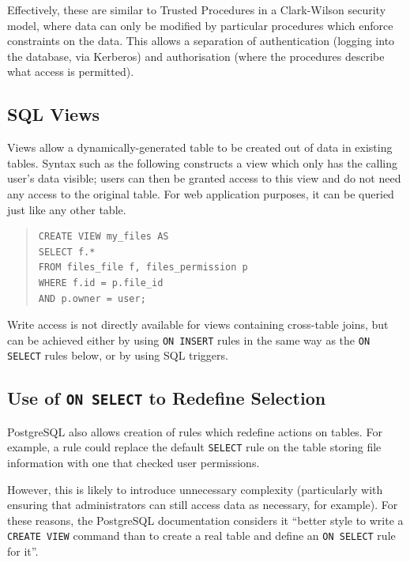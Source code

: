 \documentclass[12pt]{report}
\begin{document}
Effectively, these are similar to Trusted Procedures in a Clark-Wilson security model, where data can only be modified by particular procedures which enforce constraints on the data. This allows a separation of authentication (logging into the database, via Kerberos) and authorisation (where the procedures describe what access is permitted).

\subsection{SQL Views}
Views allow a dynamically-generated table to be created out of data in existing tables. Syntax such as the following constructs a view which only has the calling user's data visible; users can then be granted access to this view and do not need any access to the original table. For web application purposes, it can be queried just like any other table.

\begin{quote}
\begin{samepage}
\begin{verbatim}
CREATE VIEW my_files AS
SELECT f.*
FROM files_file f, files_permission p
WHERE f.id = p.file_id
AND p.owner = user;
\end{verbatim}
\end{samepage}
\end{quote}


Write access is not directly available for views containing cross-table joins, but can be achieved either by using \texttt{ON INSERT} rules in the same way as the \texttt{ON SELECT} rules below, or by using SQL triggers\cite{postgres-CREATE_VIEW}.

\subsection{Use of \texttt{ON SELECT} to Redefine Selection}
PostgreSQL also allows creation of rules which redefine actions on tables. For example, a rule could replace the default \texttt{SELECT} rule on the table storing file information with one that checked user permissions.

However, this is likely to introduce unnecessary complexity (particularly with ensuring that administrators can still access data as necessary, for example). For these reasons, the PostgreSQL documentation considers it ``better style to write a \texttt{CREATE VIEW} command than to create a real table and define an \texttt{ON SELECT} rule for it''\cite{postgres-CREATE_RULE}.
\end{document}
